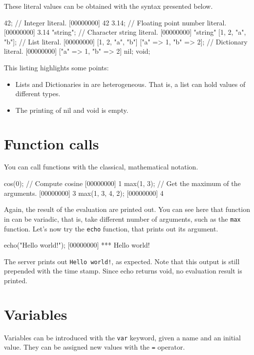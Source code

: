 These literal values can be obtained with the syntax presented below.

\begin{urbiscript}
42; // Integer literal.
[00000000] 42
3.14; // Floating point number literal.
[00000000] 3.14
"string"; // Character string literal.
[00000000] "string"
[1, 2, "a", "b"]; // List literal.
[00000000] [1, 2, "a", "b"]
["a" => 1, "b" => 2]; // Dictionary literal.
[00000000] ["a" => 1, "b" => 2]
nil;
void;
\end{urbiscript}

This listing highlights some points:
\begin{itemize}
\item Lists and Dictionaries in \us are heterogeneous. That is, a list can
  hold values of different types.
\item The printing of nil and void is empty.
\end{itemize}

\section{Function calls}

You can call functions with the classical, mathematical notation.

\begin{urbiscript}
cos(0); // Compute cosine
[00000000] 1
max(1, 3); // Get the maximum of the arguments.
[00000000] 3
max(1, 3, 4, 2);
[00000000] 4
\end{urbiscript}

Again, the result of the evaluation are printed out. You can see here
that function in \us can be variadic, that is, take different number
of arguments, such as the \lstinline{max} function. Let's now try the
\lstinline{echo} function, that prints out its argument.

\begin{urbiscript}
echo("Hello world!");
[00000000] *** Hello world!
\end{urbiscript}

The server prints out \lstinline{Hello world!}, as expected. Note that
this output is still prepended with the time stamp. Since echo returns
void, no evaluation result is printed.

\section{Variables}
Variables can be introduced with the \lstinline{var} keyword, given a
name and an initial value. They can be assigned new values with the
\lstinline{=} operator.

